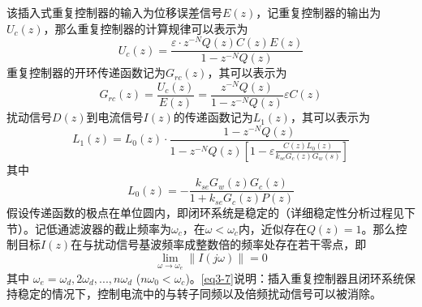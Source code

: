 \documentclass[
  lang=cn,
  degree=master,
  openany,oneside
]{nuaathesis}
\begin{document}
该插入式重复控制器的输入为位移误差信号$E(z)$，记重复控制器的输出为$U_c(z)$，那么重复控制器的计算规律可以表示为
\begin{equation}
{U_c}\left( z \right) = \frac{{\varepsilon  \cdot {z^{ - N}}Q\left( z \right)C\left( z \right)E\left( z \right)}}{{1 - {z^{ - N}}Q\left( z \right)}}
\label{eq3-3}
\end{equation}
重复控制器的开环传递函数记为$G_{rc}(z)$，其可以表示为
\begin{equation}
{G_{rc}}\left( z \right) = \frac{{{U_c}\left( z \right)}}{{E\left( z \right)}} = \frac{{{z^{ - N}}Q\left( z \right)}}{{1 - {z^{ - N}}Q\left( z \right)}}\varepsilon C\left( z \right)
\label{eq3-4}
\end{equation}
扰动信号$D(z)$到电流信号$I(z)$的传递函数记为$L_1(z)$，其可以表示为
\begin{equation}
{L_1}\left( z \right) = {L_0}\left( z \right) \cdot \frac{{1 - {z^{ - N}}Q\left( z \right)}}{{1 - {z^{ - N}}Q\left( z \right)\left[ {1 - \varepsilon \frac{{C\left( z \right){L_0}\left( z \right)}}{{{k_{se}}{G_c}\left( z \right){G_w}\left( s \right)}}} \right]}}
\label{eq3-5}
\end{equation}
其中
\begin{equation}
{L_0}\left( z \right) =  - \frac{{{k_{se}}{G_w}\left( z \right){G_c}\left( z \right)}}{{1 + {k_{se}}{G_c}\left( z \right)P\left( z \right)}}
\label{eq3-6}
\end{equation}
假设传递函数的极点在单位圆内，即闭环系统是稳定的（详细稳定性分析过程见下节）。记低通滤波器的截止频率为$\omega_c $，在$\omega<\omega_c$内，近似存在$Q(z)=1$。那么控制目标$I(z)$在与扰动信号基波频率成整数倍的频率处存在若干零点，即
\begin{equation}
\label{eq3-7}
\mathop {\lim }\limits_{\omega  \to {\omega _e}} \left\| {I\left( {j\omega } \right)} \right\| = 0
\end{equation}
其中 $\omega _e=\omega _d, 2\omega _d,...,n\omega _d$ ($n\omega _0$$<$$\omega _c$)。\autoref{eq3-7}说明：插入重复控制器且闭环系统保持稳定的情况下，控制电流中的与转子同频以及倍频扰动信号可以被消除。
\end{document}
